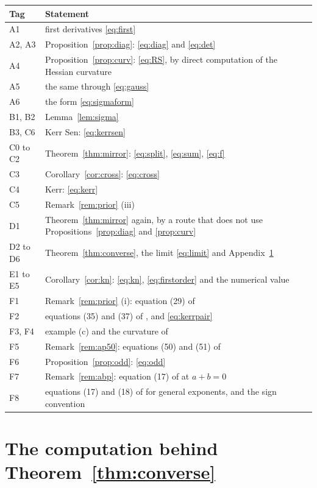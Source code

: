 \documentclass[11pt]{article}
\theoremstyle{definition}
\theoremstyle{remark}
\begin{document}
\begin{center}
\begin{tabular}{ll}
\toprule
Tag & Statement \\
\midrule
A1 & first derivatives \eqref{eq:first} \\
A2, A3 & Proposition~\ref{prop:diag}: \eqref{eq:diag} and \eqref{eq:det} \\
A4 & Proposition~\ref{prop:curv}: \eqref{eq:RS}, by direct computation of the Hessian curvature \\
A5 & the same through \eqref{eq:gauss} \\
A6 & the form \eqref{eq:sigmaform} \\
B1, B2 & Lemma~\ref{lem:sigma} \\
B3, C6 & Kerr Sen: \eqref{eq:kerrsen} \\
C0 to C2 & Theorem~\ref{thm:mirror}: \eqref{eq:split}, \eqref{eq:sum}, \eqref{eq:f} \\
C3 & Corollary~\ref{cor:cross}: \eqref{eq:cross} \\
C4 & Kerr: \eqref{eq:kerr} \\
C5 & Remark~\ref{rem:prior} (iii) \\
D1 & Theorem~\ref{thm:mirror} again, by a route that does not use Propositions~\ref{prop:diag} and \ref{prop:curv} \\
D2 to D6 & Theorem~\ref{thm:converse}, the limit \eqref{eq:limit} and Appendix~\ref{app:converse} \\
E1 to E5 & Corollary~\ref{cor:kn}: \eqref{eq:kn}, \eqref{eq:firstorder} and the numerical value \\
F1 & Remark~\ref{rem:prior} (i): equation (29) of \cite{ABP15} \\
F2 & equations (35) and (37) of \cite{ABP15}, and \eqref{eq:kerrpair} \\
F3, F4 & example (c) and the curvature of \cite{BMMA} \\
F5 & Remark~\ref{rem:ap50}: equations (50) and (51) of \cite{AP06} \\
F6 & Proposition~\ref{prop:odd}: \eqref{eq:odd} \\
F7 & Remark~\ref{rem:abp}: equation (17) of \cite{ABP06} at $a+b=0$ \\
F8 & equations (17) and (18) of \cite{ABP06} for general exponents, and the sign convention \\
\bottomrule
\end{tabular}
\end{center}

\section{The computation behind Theorem~\ref{thm:converse}}\label{app:converse}
\end{document}
